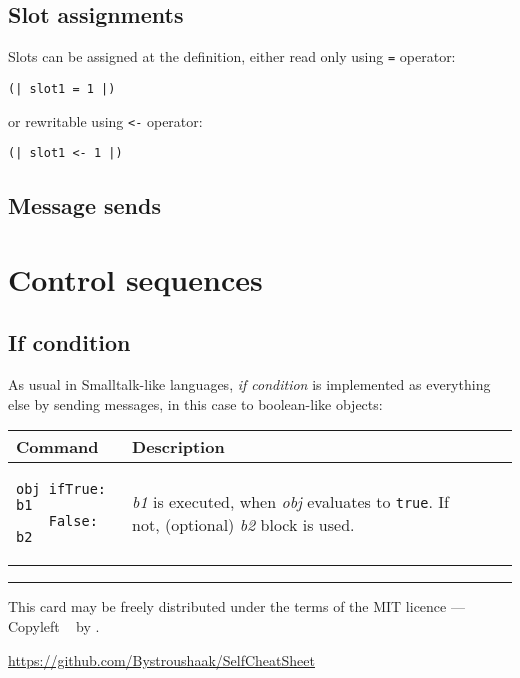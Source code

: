 \documentclass[10pt]{article}
\begin{document}
\begin{multicols*}{3}
\subsection{Slot assignments}
Slots can be assigned at the definition, either read only using \texttt{=} operator:

\begin{verbatim}
(| slot1 = 1 |)
\end{verbatim}

or rewritable using \texttt{<-} operator: %
\begin{verbatim}
(| slot1 <- 1 |)
\end{verbatim}

\subsection{Message sends}





\section{Control sequences}
\subsection{If condition}

As usual in Smalltalk-like languages, \textit{if condition} is implemented as everything else by sending messages, in this case to boolean-like objects:

\vspace*{0.2cm}
\begin{tabular}{ p{70pt} p{140pt} l l }
Command & Description \\ \hline
\begin{verbatim}obj ifTrue: b1
    False: b2
\end{verbatim}
&\vspace*{0.1cm} \textit{b1} is executed, when \textit{obj} evaluates to \texttt{true}.
If not, (optional) \textit{b2} block is used. \\
\hline


\end{tabular}





\vfill \hrule\smallskip
{\small This card may be freely distributed under
the terms of the MIT licence ---
Copyleft \textcopyleft\ \thedate{} by \href{http://kitakitsune.org}{\theauthor}.

\url{https://github.com/Bystroushaak/SelfCheatSheet}
}

\end{multicols*}
\end{document}
